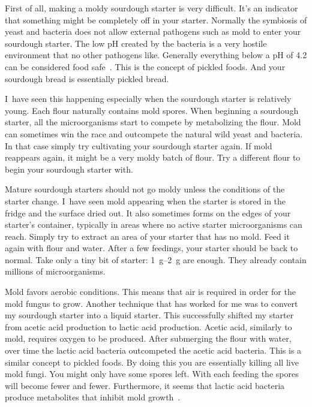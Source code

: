 First of all, making a moldy sourdough starter is very difficult.
It's an indicator that something might be completely off in your starter.
Normally the symbiosis of yeast and bacteria does not allow external
pathogens such as mold to enter your sourdough starter.
The low pH created by the bacteria is a very hostile environment
that no other pathogens like. Generally everything below a pH
of 4.2 can be considered food safe~\cite{food+safe+ph}. This
is the concept of pickled foods. And your sourdough bread
is essentially pickled bread.

I~have seen this happening especially when the sourdough
starter is relatively young. Each flour naturally contains
mold spores. When beginning a sourdough starter, all
the microorganisms start to compete by metabolizing the
flour. Mold can sometimes win the race and outcompete
the natural wild yeast and bacteria. In that case simply
try cultivating your sourdough starter again. If mold reappears
again, it might be a very moldy batch of flour. Try a different
flour to begin your sourdough starter with.

Mature sourdough starters should not go moldy unless the conditions
of the starter change. I~have seen mold appearing when the starter is stored
in the fridge and the surface dried out. It also sometimes forms on the
edges of your starter's container, typically in areas where no active
starter microorganisms can reach. Simply try to extract an
area of your starter that has no mold. Feed it again with flour and
water. After a few feedings, your starter should be back to normal.
Take only a tiny bit of starter: \qtyrange{1}{2}{\gram} are enough. They already
contain millions of microorganisms.

Mold favors aerobic conditions. This means that air is required in order
for the mold fungus to grow. Another technique that has worked for me
was to convert my sourdough starter into a liquid starter. This successfully
shifted my starter from acetic acid production to lactic acid production.
Acetic acid, similarly to mold, requires oxygen to be produced. After
submerging the flour with water, over time the lactic acid bacteria
outcompeted the acetic acid bacteria. This is a similar concept to pickled
foods. By doing this you are essentially killing all live mold fungi. You
might only have some spores left. With each feeding the spores will become
fewer and fewer. Furthermore, it seems that lactic acid bacteria produce
metabolites that inhibit mold growth~\cite{mold+lactic+acid+bacteria}.

